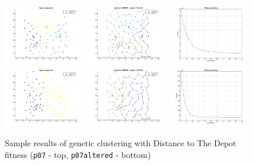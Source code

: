\documentclass[conference]{IEEEtran}
\begin{document}
\begin{figure}
  \begin{center}
    \includegraphics[width=0.32\textwidth]{images/N1depot_assignment}
    \includegraphics[width=0.32\textwidth]{images/N1solution}
    \includegraphics[width=0.32\textwidth]{images/N1fitness}
    \includegraphics[width=0.32\textwidth]{images/N1depot_assignment_p07altered}
    \includegraphics[width=0.32\textwidth]{images/N1solution_p07altered}
    \includegraphics[width=0.32\textwidth]{images/N1fitness_p07altered}
    \caption{Sample results of genetic clustering with Distance to The Depot fitness (\texttt{p07} - top, \texttt{p07altered} - bottom)}
    \label{n1res}
  \end{center}
\end{figure}
\end{document}
